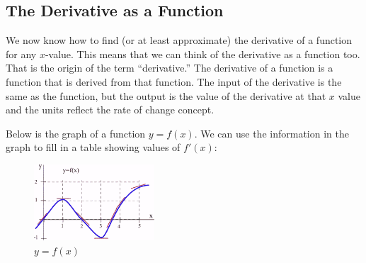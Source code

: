 \subsection{The Derivative as a Function}
We now know how to find (or at least approximate) the derivative of a function for any $x$-value. This means that we can think of the derivative as a function too. That is the origin of the term ``derivative.'' The derivative of a function is a function that is derived from that function. The input of the derivative is the same as the function, but the output is the value of the derivative at that $x$ value and the units reflect the rate of change concept.

\begin{example}
Below is the graph of a function $y=f(x)$. We can use the information in the graph to fill in a table showing values of $f'(x)$:
\begin{figure}[!ht]
  \centering
    \includegraphics[width=0.4\textwidth]{img/chap2/image023.png}
    \caption{$y=f(x)$}
    \label{fig:2-3-fx}
\end{figure}


\end{example}

